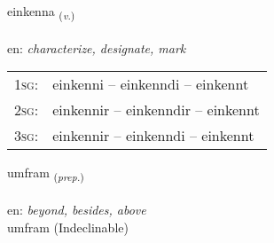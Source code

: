 \documentclass[frontgrid, backgrid]{flacards}\usepackage[]{graphicx}\usepackage[]{color}
\begin{document}
\renewcommand{\flhead}{\vskip5pt \fboxsep=0pt {\small\bfseries\footnotesize Sagnorð | Verb}}
\renewcommand{\fcfoot}{\vskip5pt \fboxsep=0pt \hspace{2pt}{\small\bfseries\footnotesize 2K}}

\renewcommand{\blhead}{\vskip5pt {\small\bfseries\footnotesize Sagnorð | Verb }}
\renewcommand{\bcfoot}{\vskip5pt \hspace{2pt}{\small\bfseries\footnotesize 2K}}


{einkenna \small{\textsubscript{(\textit{v.})}} \\[1ex] %
\textphonetic{[eiɲcʰɛna]} \\
en: \emph{characterize, designate, mark} \\  [2ex]
\renewcommand*{\arraystretch}{0.8}
\begin{tabular}{p{1cm}l}
\textsc{1sg}: & einkenni -- einkenndi -- einkennt \\ 
\textsc{2sg}: & einkennir -- einkenndir -- einkennt \\ 
\textsc{3sg}: & einkennir -- einkenndi -- einkennt \\ 
\end{tabular}
}


\renewcommand{\flhead}{\vskip5pt \fboxsep=0pt {\small\bfseries\footnotesize Forsetning | Preposition}}
\renewcommand{\fcfoot}{\vskip5pt \fboxsep=0pt \hspace{2pt}{\small\bfseries\footnotesize 2K}}

\renewcommand{\blhead}{\vskip5pt {\small\bfseries\footnotesize Forsetning | Preposition }}
\renewcommand{\bcfoot}{\vskip5pt \hspace{2pt}{\small\bfseries\footnotesize 2K}}


{umfram \small{\textsubscript{(\textit{prep.})}} \\[1ex]
\textphonetic{[ʏmfram]} \\
en: \emph{beyond, besides, above} \\  [2ex]
umfram (Indeclinable)}
\end{document}
